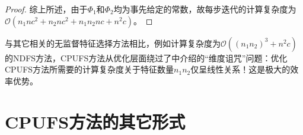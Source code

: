 \begin{proof}
综上所述，由于$\Phi_{1}$和$\Phi_{2}$均为事先给定的常数，故每步迭代的计算复杂度为$\mathcal{O}(n_{1}nc^{2}+n_{2}nc^{2}+n_{1}n_{2}nc+n^{2}c)$。
\end{proof}\vspace{0.5em}

与其它相关的无监督特征选择方法相比，例如计算复杂度为$\mathcal{O}((n_{1}n_{2})^{3}+n^{2}c)$的NDFS方法，CPUFS方法从优化层面绕过了中介绍的“维度诅咒”问题：优化CPUFS方法所需要的计算复杂度关于特征数量$n_{1}n_{2}$仅呈线性关系！这是极大的效率优势。

\section{CPUFS方法的其它形式}
